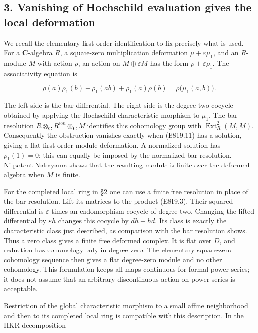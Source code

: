 \subsection{3. Vanishing of Hochschild evaluation gives the local
deformation}\label{SF-E819-vanishing-of-hochschild-evaluation-gives-the-local-deformation}

We recall the elementary first-order identification to fix precisely
what is used. For a \(\mathbf C\)-algebra \(R\), a square-zero
multiplication deformation \(\mu+\varepsilon\mu_1\), and an \(R\)-module
\(M\) with action \(\rho\), an action on \(M\oplus\varepsilon M\) has
the form \(\rho+\varepsilon\rho_1\). The associativity equation is

\[
 \rho(a)\rho_1(b)-\rho_1(ab)+\rho_1(a)\rho(b)
       =\rho\bigl(\mu_1(a,b)\bigr).
 \tag{E819.11}
\]

The left side is the bar differential. The right side is the degree-two
cocycle obtained by applying the Hochschild characteristic morphism to
\(\mu_1\). The bar resolution
\(R\otimes_{\mathbf C}R^{\otimes n}\otimes_{\mathbf C}M\) identifies
this cohomology group with \(\operatorname{Ext}^2_R(M,M)\). Consequently
the obstruction vanishes exactly when (E819.11) has a solution, giving a
flat first-order module deformation. A normalized solution has
\(\rho_1(1)=0\); this can equally be imposed by the normalized bar
resolution. Nilpotent Nakayama shows that the resulting module is finite
over the deformed algebra when \(M\) is finite.

For the completed local ring in §2 one can use a finite free resolution
in place of the bar resolution. Lift its matrices to the product
(E819.3). Their squared differential is \(\varepsilon\) times an
endomorphism cocycle of degree two. Changing the lifted differential by
\(\varepsilon h\) changes this cocycle by \(dh+hd\). Its class is
exactly the characteristic class just described, as comparison with the
bar resolution shows. Thus a zero class gives a finite free deformed
complex. It is flat over \(D\), and reduction has cohomology only in
degree zero. The elementary square-zero cohomology sequence then gives a
flat degree-zero module and no other cohomology. This formulation keeps
all maps continuous for formal power series; it does not assume that an
arbitrary discontinuous action on power series is acceptable.

Restriction of the global characteristic morphism to a small affine
neighborhood and then to its completed local ring is compatible with
this description. In the HKR decomposition


